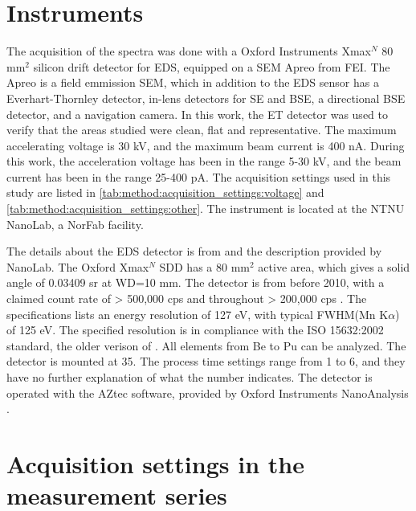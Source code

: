 \section{Instruments}
\label{method:instruments}

The acquisition of the spectra was done with a Oxford Instruments Xmax$^N$ 80 mm$^2$ silicon drift detector for EDS, equipped on a SEM Apreo from FEI.
The Apreo is a field emmission SEM, which in addition to the EDS sensor has a Everhart-Thornley detector, in-lens detectors for SE and BSE, a directional BSE detector, and a navigation camera.
In this work, the ET detector was used to verify that the areas studied were clean, flat and representative.
The maximum accelerating voltage is 30 kV, and the maximum beam current is 400 nA.
During this work, the acceleration voltage has been in the range 5-30 kV, and the beam current has been in the range 25-400 pA.
The acquisition settings used in this study are listed in \cref{tab:method:acquisition_settings:voltage} and \cref{tab:method:acquisition_settings:other}.
The instrument is located at the NTNU NanoLab, a NorFab facility.

The details about the EDS detector is from \cite{oxford_xmax_80} and the description provided by NanoLab.
The Oxford Xmax$^N$ SDD has a 80 mm$^2$ active area, which gives a solid angle of 0.03409 sr at WD=10 mm.
The detector is from before 2010, with a claimed count rate of > 500,000 cps and throughout > 200,000 cps \cite{oxford_xmax_80}.
The specifications lists an energy resolution of 127 eV, with typical FWHM(Mn K$\alpha$) of 125 eV.
The specified resolution is in compliance with the ISO 15632:2002 standard, the older verison of \cite{iso_qc_15632}.
All elements from Be to Pu can be analyzed.
The detector is mounted at 35\textdegree.
The process time settings range from 1 to 6, and they have no further explanation of what the number indicates.
The detector is operated with the AZtec software, provided by Oxford Instruments NanoAnalysis \cite{aztec_manual}.



\section{Acquisition settings in the measurement series}
\label{method:acquisition_settings}


